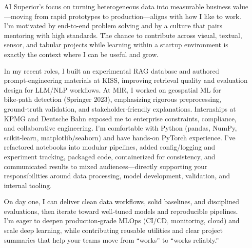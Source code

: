 AI Superior’s focus on turning heterogeneous data into measurable business value—moving from rapid prototypes to production—aligns with how I like to work. I’m motivated by end-to-end problem solving and by a culture that pairs mentoring with high standards. The chance to contribute across visual, textual, sensor, and tabular projects while learning within a startup environment is exactly the context where I can be useful and grow.

In my recent roles, I built an experimental RAG database and authored prompt‑engineering materials at KISS, improving retrieval quality and evaluation design for LLM/NLP workflows. At MIR, I worked on geospatial ML for bike‑path detection (Springer 2023), emphasizing rigorous preprocessing, ground‑truth validation, and stakeholder‑friendly explanations. Internships at KPMG and Deutsche Bahn exposed me to enterprise constraints, compliance, and collaborative engineering. I’m comfortable with Python (pandas, NumPy, scikit‑learn, matplotlib/seaborn) and have hands‑on PyTorch experience. I’ve refactored notebooks into modular pipelines, added config/logging and experiment tracking, packaged code, containerized for consistency, and communicated results to mixed audiences—directly supporting your responsibilities around data processing, model development, validation, and internal tooling.

On day one, I can deliver clean data workflows, solid baselines, and disciplined evaluations, then iterate toward well‑tuned models and reproducible pipelines. I’m eager to deepen production‑grade MLOps (CI/CD, monitoring, cloud) and scale deep learning, while contributing reusable utilities and clear project summaries that help your teams move from “works” to “works reliably.”